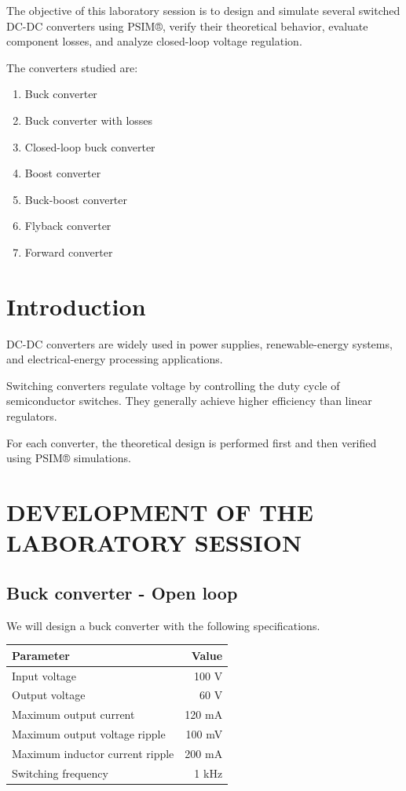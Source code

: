 \documentclass[
  paper=a4,
  oneside  ,captions=tableheading
]{scrartcl}
\newcounter{none}
\providecommand{\tightlist}{%
  \setlength{\itemsep}{0pt}\setlength{\parskip}{0pt}}
\begin{document}
The objective of this laboratory session is to design and simulate
several switched DC-DC converters using PSIM®, verify their theoretical
behavior, evaluate component losses, and analyze closed-loop voltage
regulation.

The converters studied are:

\begin{enumerate}
\def\labelenumi{\arabic{enumi}.}
\tightlist
\item
  Buck converter
\item
  Buck converter with losses
\item
  Closed-loop buck converter
\item
  Boost converter
\item
  Buck-boost converter
\item
  Flyback converter
\item
  Forward converter
\end{enumerate}

\section{Introduction}\label{introduction}

DC-DC converters are widely used in power supplies, renewable-energy
systems, and electrical-energy processing applications.

Switching converters regulate voltage by controlling the duty cycle of
semiconductor switches. They generally achieve higher efficiency than
linear regulators.

For each converter, the theoretical design is performed first and then
verified using PSIM® simulations.

\section{DEVELOPMENT OF THE LABORATORY
SESSION}\label{development-of-the-laboratory-session}

\subsection{Buck converter - Open
loop}\label{buck-converter---open-loop}

We will design a buck converter with the following specifications.

{\def\LTcaptype{none} %
\begin{longtable}[]{@{}lr@{}}
\toprule\noalign{}
Parameter & Value \\
\midrule\noalign{}
\endhead
\bottomrule\noalign{}
\endlastfoot
Input voltage & 100 V \\
Output voltage & 60 V \\
Maximum output current & 120 mA \\
Maximum output voltage ripple & 100 mV \\
Maximum inductor current ripple & 200 mA \\
Switching frequency & 1 kHz \\
\end{longtable}
}
\end{document}
